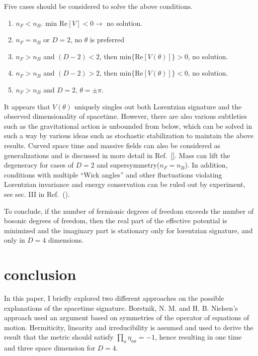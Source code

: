 \documentclass[%
 reprint,
groupedaddress,
showpacs,
 amsmath,amssymb,
 aps,
prb,
]{revtex4-1}
\begin{document}
Five cases should be considered to solve the above conditions.
\begin{enumerate}
	\item $ n_F<n_B $. min $\mathrm{Re}[V]<0 \rightarrow $ no solution.
	\item $n_F = n_B$ or $ D=2 $, no $\theta $ is preferred
	\item $ n_F > n_B $ and $ (D-2)<2 $, then $ \mathrm{min} \{ \mathrm{Re} [V(\theta)] \}>0 $, no solution.
	\item $ n_F > n_B $ and $ (D-2)>2 $, then $ \mathrm{min} \{ \mathrm{Re} [V(\theta)] \}<0 $, no solution.
	\item $ n_F > n_B $ and $ D=2 $, $\theta = \pm \pi $.
\end{enumerate}
It appears that $ V(\theta) $ uniquely singles out both Lorentzian signature and the observed dimensionality of spacetime. However, there are also various subtleties such as the gravitational action is unbounded from below, which can be solved in such a way by various ideas such as stochastic stabilization to maintain the above results. Curved space time and massive fields can also be considered as generalizations and is discussed in more detail in Ref.~[]. Mass can lift the degeneracy for cases of $D=2$ and supersymmetry($n_F=n_B$). In addition, conditions with multiple ``Wick angles'' and other fluctuations violating Lorentzian invariance and energy conservation can be ruled out by experiment, see sec. III in Ref.~().

To conclude, if the number of fermionic
degrees of freedom exceeds the number of bosonic
degrees of freedom, then the real part of the effective
potential is minimized and the imaginary part is
stationary only for lorentzian signature, and only in
$D = 4$ dimensions. 





\section{conclusion} %
\label{sec:conclusion}

In this paper, I briefly explored two different approaches on the possible explanations of the spacetime signature. Borstnik, N. M. and H. B. Nielsen's approach used an argument based on symmetries of the operator of equations of motion. Hermiticity, linearity and irreducibility is assumed and used to derive the result that the metric should satisfy $ \prod_a \eta_{aa}=-1$, hence resulting in one time and three space dimension for $D=4$.
\end{document}
